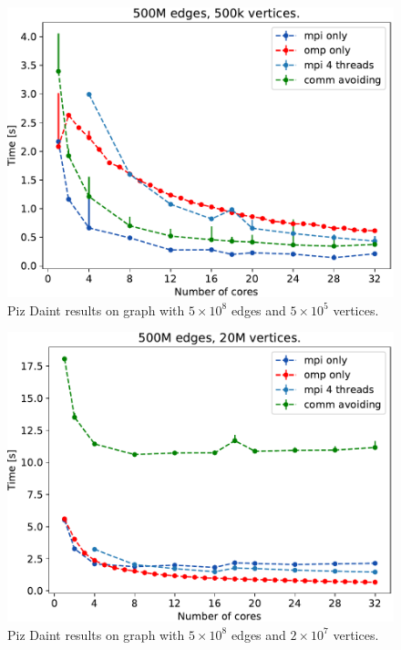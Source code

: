 
\begin{figure}%
\includegraphics[width=\fsize]{data/plot_vertices_500k.pdf}
\caption{Piz Daint results on graph with $5\times10^8$ edges and $5\times10^5$ vertices.}
\label{fig:mpi_omp_commavoiding_daint_1}
\end{figure}

\begin{figure}%
\includegraphics[width=\fsize]{data/plot_vertices_20M.pdf}
\caption{Piz Daint results on graph with $5\times10^8$ edges and $2\times10^7$ vertices.}
\label{fig:mixed_daint}
\end{figure}

